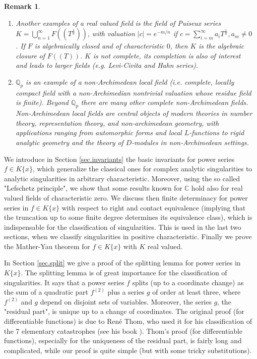 \documentclass[11pt]{article}
\newtheorem{Remark}[Definition]{Remark}
\newcommand{\C}{{\mathbb C}}
\begin{document}
\begin{Remark}
{\begin{enumerate}
\item  [(5)] Another examples of a real valued field  is the field of {\em Puiseux series}  $K=\bigcup_{n=1}^\infty F((T^{\frac{1}{n}}))$,  with valuation 
$|c| = e^{-m/n}$ 
if $c=\sum_{i=m}^\infty a_iT^{\frac{i}{n}}, a_m\ne0$.
 {If $F$ is algebraically closed and of characteristic $0$, then $K$ is the algebraic closure of $F((T))$.
$K$ is not complete, its completion is also of interest and leads to larger fields (e.g. Levi-Civita and Hahn series).}

\item  [(6)]   {$\mathbb{Q}_p$ is an example of a non‑Archimedean local field  (i.e. complete, locally compact field with a non-Archimedian nontrivial valuation whose residue field is finite). Beyond $\mathbb{Q}_p$ there are many other complete non-Archimedean fields. Non‑Archimedean local fields are central objects  of modern theories in number theory, representation
theory, and non‑archimedean geometry, with applications ranging from automorphic forms and local $L$‑functions to rigid analytic geometry and the theory
of $D$‑modules in non‑Archimedean settings.}
\end{enumerate}
}
\end{Remark}

 
We introduce in Section \ref{sec.invariants} the basic invariants for power series $f \in K\{x\}$,  which generalize 
the classical ones for complex analytic singularities to analytic singularities in arbitrary characteristic. Moreover, using the so called "Lefschetz principle", we show that some results known for $\C$ hold also for real valued fields of characteristic zero.
We discuss then finite determinacy  for power series in $f \in K\{x\}$ with respect to right and contact equivalence  (implying that the truncation up to some finite degree determines its equivalence class), which is indispensable for the classification of singularities. This is used in the last two sections, when we classify singularities in positive characteristic. Finally we prove the Mather-Yau theorem for $f\in K\{x\}$ with $K$ real valued.

In Section \ref{sec.split} we give a proof of the splitting lemma for power series in $K\{x\}$. The splitting lemma is of great importance for the classification of singularities. It says that a power series $f$  splits (up to a coordinate change) as the sum of a quadratic part $f^{(2)}$ plus a series $g$ of order at least three, where $f^{(2)}$ and $g$ depend on disjoint sets of variables.  
Moreover, the series $g$, the "residual part", is unique up to a  change of coordinates.
The original proof (for diﬀerentiable functions) is due to Ren\'e Thom, who used it for his classification of the 7 elementary catastrophes (see his book \cite[§ 5.2D]{Th75}). Thom's proof (for differentiable functions), especially for the uniqueness of the residual part, is fairly long and complicated, while  our proof is quite simple (but with some tricky substitutions). 
\end{document}
